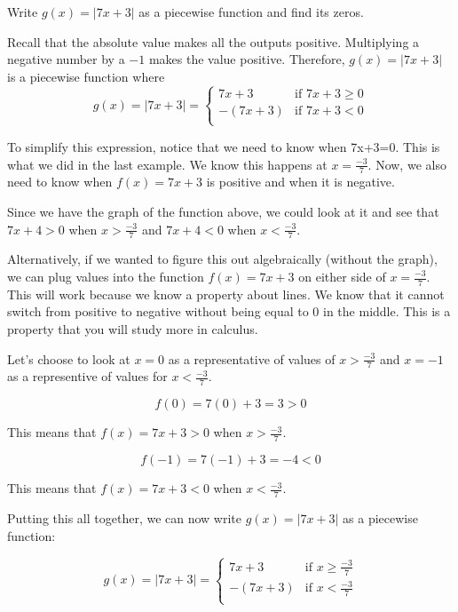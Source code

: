 \documentclass[nooutcomes]{ximera}
\begin{document}
\begin{example}
Write $g(x)=|7x+3|$ as a piecewise function and find its zeros.
\begin{explanation}
Recall that the absolute value makes all the outputs positive.  Multiplying a negative number by a $-1$ makes the value positive.  Therefore, $g(x)=|7x+3|$ is a piecewise function where
$$
  g(x) =|7x+3|=
  \begin{cases}
                                   7x+3 & \text{if $7x+3 \geq 0$} \\
                                   -(7x+3) & \text{if $7x+3 <0$} \\
  \end{cases}
$$

To simplify this expression, notice that we need to know when 7x+3=0. This is what we did in the last example.  We know this happens at $x=\tfrac{-3}{7}$.  Now, we also need to know when $f(x)=7x+3$ is positive and when it is negative.  

Since we have the graph of the function above, we could look at it and see that $7x+4>0$ when $x>\tfrac{-3}{7}$ and $7x+4<0$ when $x<\tfrac{-3}{7}$.

Alternatively, if we wanted to figure this out algebraically (without the graph), we can plug values into the function  $f(x)=7x+3$ on either side of  $x=\tfrac{-3}{7}$.  This will work because we know a property about lines.  We know that it cannot switch from positive to negative without being equal to 0 in the middle.  This is a property that you will study more in calculus.  

Let's choose to look at $x=0$ as a representative of values of $x>\tfrac{-3}{7}$ and $x=-1$ as a representive of values for $x<\tfrac{-3}{7}$.

$$
f(0)=7(0)+3=3>0
$$

This means that $f(x)=7x+3 >0$ when $x>\tfrac{-3}{7}$.

$$
f(-1)=7(-1)+3=-4<0 
$$

This means that $f(x)=7x+3 <0$ when $x<\tfrac{-3}{7}$.

Putting this all together, we can now write  $g(x)=|7x+3|$ as a piecewise function:

$$
  g(x) =|7x+3|=
  \begin{cases}
                                   7x+3 & \text{if $x \geq \tfrac{-3}{7}$} \\
                                   -(7x+3) & \text{if $x < \tfrac{-3}{7}$} \\
  \end{cases}
$$


\end{explanation}
\end{example}
\end{document}

